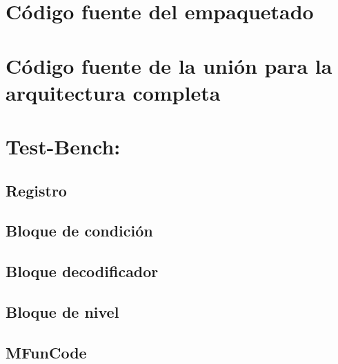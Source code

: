 \documentclass[8pt,executivepaper]{article}
\begin{document}
\section{Código fuente del empaquetado}
\begin{center}
  
\end{center}
\section{Código fuente de la unión para la arquitectura completa}
\begin{center}
  
\end{center}

\section{Test-Bench:}
\subsection{Registro}
\begin{center}
  
\end{center}
\subsection{Bloque de condición}
\begin{center}
  
\end{center}
\subsection{Bloque decodificador}
\begin{center}
  
\end{center}
\subsection{Bloque de nivel}
\begin{center}
  
\end{center}
\subsection{MFunCode}
\begin{center}
  
\end{center}
\end{document}
